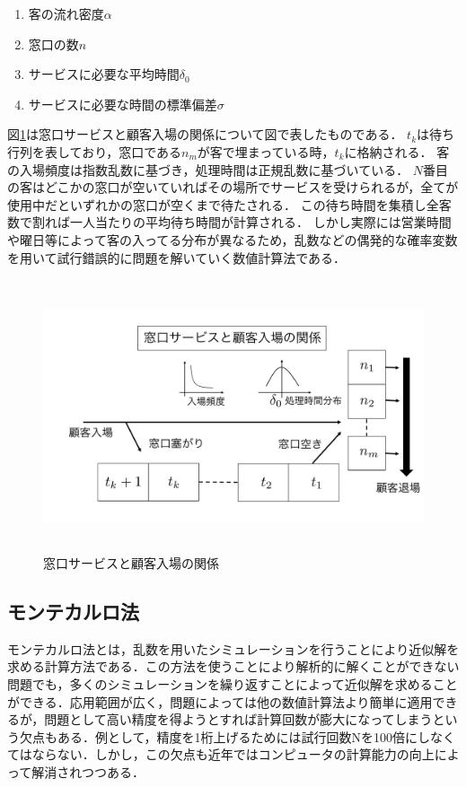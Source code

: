 \documentclass[12pt,a4j]{ltjsarticle}
\begin{document}
\begin{enumerate}[label=(\Roman*)]
	\item 客の流れ密度$\alpha$
　	\item 窓口の数$n$
　	\item サービスに必要な平均時間$\delta_0$
　	\item サービスに必要な時間の標準偏差$\sigma$
\end{enumerate} 

\clearpage

図\ref{fig:待ち行列概要}は窓口サービスと顧客入場の関係について図で表したものである．
$t_k$は待ち行列を表しており，窓口である$n_m$が客で埋まっている時，$t_k$に格納される．
客の入場頻度は指数乱数に基づき，処理時間は正規乱数に基づいている．
$N$番目の客はどこかの窓口が空いていればその場所でサービスを受けられるが，全てが使用中だといずれかの窓口が空くまで待たされる．
この待ち時間を集積し全客数で割れば一人当たりの平均待ち時間が計算される．
しかし実際には営業時間や曜日等によって客の入ってる分布が異なるため，乱数などの偶発的な確率変数を用いて試行錯誤的に問題を解いていく数値計算法である．

\vspace{5mm}
\begin{figure}[h]
\begin{center}
\includegraphics[height = 80mm  ] {figures/layout2.pdf}
\caption{窓口サービスと顧客入場の関係}
\label{fig:待ち行列概要}
\end{center}
\end{figure}

\clearpage

\subsection{モンテカルロ法}
モンテカルロ法とは，乱数を用いたシミュレーションを行うことにより近似解を求める計算方法である．この方法を使うことにより解析的に解くことができない問題でも，多くのシミュレーションを繰り返すことによって近似解を求めることができる．応用範囲が広く，問題によっては他の数値計算法より簡単に適用できるが，問題として高い精度を得ようとすれば計算回数が膨大になってしまうという欠点もある．例として，精度を1桁上げるためには試行回数Nを100倍にしなくてはならない．しかし，この欠点も近年ではコンピュータの計算能力の向上によって解消されつつある．
\end{document}
